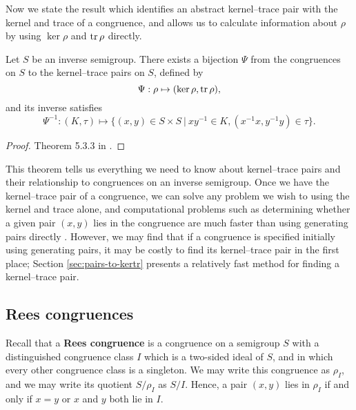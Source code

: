 Now we state the result which identifies an abstract kernel--trace pair with the
kernel and trace of a congruence, and allows us to calculate information about
$\rho$ by using $\ker \rho$ and $\operatorname{tr} \rho$ directly.

\begin{theorem}
  \label{thm:kernel-trace-pair}

  Let $S$ be an inverse semigroup.  There exists a bijection $\Psi$ from the
  congruences on $S$ to the kernel--trace pairs on $S$, defined by
  $$\Psi: \rho \mapsto (\ker\rho, \operatorname{tr}\rho),$$
  and its inverse satisfies
  $$\Psi^{-1} : (K,\tau) \mapsto
  \{(x,y) \in S \times S ~|~ xy^{-1} \in K, (x^{-1}x, y^{-1}y) \in \tau\}.$$
  \begin{proof}
    Theorem 5.3.3 in \cite{howie}.
  \end{proof}
\end{theorem}

This theorem tells us everything we need to know about kernel--trace pairs and
their relationship to congruences on an inverse semigroup.  Once we have the
kernel--trace pair of a congruence, we can solve any problem we wish to using the
kernel and trace alone, and computational problems such as determining whether a
given pair $(x,y)$ lies in the congruence are much faster than using
generating pairs directly \cite[\S 6.1.3]{mtorpey_msc}.  However, we may find
that if a congruence is specified initially using generating pairs, it may be
costly to find its kernel--trace pair in the first place; Section
\ref{sec:pairs-to-kertr} presents a relatively fast method for finding a kernel--trace pair.

\subsection{Rees congruences}
\label{sec:converting-rees}
Recall that a \textbf{Rees congruence} is a congruence on a semigroup $S$ with a
distinguished congruence class $I$ which is a two-sided ideal of $S$, and in
which every other congruence class is a singleton.  We may write this congruence
as $\rho_I$, and we may write its quotient $S/\rho_I$ as $S/I$.  Hence, a pair
$(x,y)$ lies in $\rho_I$ if and only if $x=y$ or $x$ and $y$ both lie in $I$.

